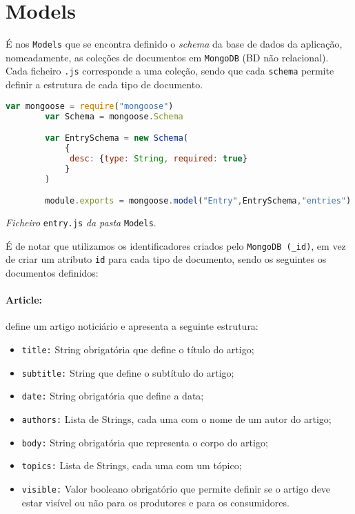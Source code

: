 \section{Models}\label{c:models}
 
É nos \texttt{Models} que se encontra definido o \textit{schema} da base de dados da aplicação, nomeadamente, as coleções de documentos em \texttt{MongoDB} (BD não relacional). Cada ficheiro \texttt{.js} corresponde a uma coleção, sendo que cada \texttt{schema} permite definir a estrutura de cada tipo de documento. 

\begin{framed}
\begin{lstlisting}[language=JavaScript]
	    var mongoose = require("mongoose")
	    var Schema = mongoose.Schema

	    var EntrySchema = new Schema(
	        {
	         desc: {type: String, required: true}
	        }
	    )

	    module.exports = mongoose.model("Entry",EntrySchema,"entries")
\end{lstlisting}
\end{framed}

\begin{center}
\textit{Ficheiro} \texttt{entry.js} \textit{da pasta} \texttt{Models}.
\end{center}

É de notar que utilizamos os identificadores criados pelo \texttt{MongoDB (\_id)}, em vez de criar um atributo \texttt{id} para cada tipo de documento, sendo os seguintes os documentos definidos:

\paragraph{\textbf{Article:}} define um artigo noticiário e apresenta a seguinte estrutura:
    \begin{itemize}
        \item \texttt{title:} String obrigatória que define o título do artigo;
        \item \texttt{subtitle:} String que define o subtítulo do artigo;
        \item \texttt{date:} String obrigatória que define a data;
        \item \texttt{authors:} Lista de Strings, cada uma com o nome de um autor do artigo;
        \item \texttt{body:} String obrigatória que representa o corpo do artigo;
        \item \texttt{topics:} Lista de Strings, cada uma com um tópico;
        \item \texttt{visible:} Valor booleano obrigatório que permite definir se o artigo deve estar visível ou não para os produtores e para os consumidores.
    \end{itemize}

